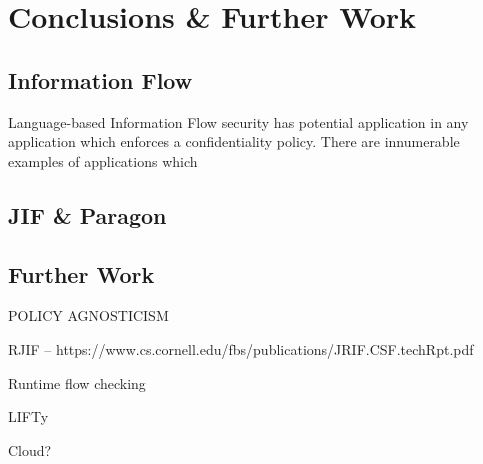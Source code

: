 \chapter{Conclusions \& Further Work}

\section{Information Flow}

Language-based Information Flow security has potential application in any application which enforces a confidentiality policy. There are innumerable examples of applications which 

\section{JIF \& Paragon}

\section{Further Work}

POLICY AGNOSTICISM

RJIF -- https://www.cs.cornell.edu/fbs/publications/JRIF.CSF.techRpt.pdf

Runtime flow checking

LIFTy \cite{polikarpova2016lifty}

Cloud?